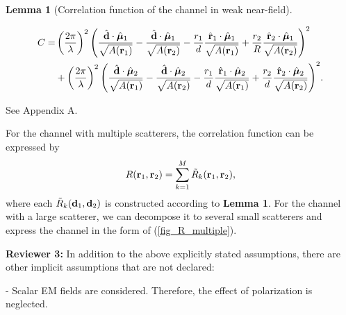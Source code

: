 \documentclass[a4paper,12pt]{article}
\newtheorem{lemma}{\bf Lemma}
\newenvironment{IEEEproof}{{\it Proof. }}{}
\begin{document}
\begin{framed}
\begin{lemma}[{\color{red}Correlation function of the channel in weak near-field}]
\begin{equation}
\begin{aligned}
	   \end{aligned}
   \end{equation}
   \else
   \begin{equation}
	   \begin{aligned}
		C =& \left( \frac{2\pi}{\lambda}  \right)^2 \Bigg( \frac{\hat{\bf d}\cdot \hat{\boldsymbol{\mu}}_1}{\sqrt{A({\bf r}_1)}} - \frac{\hat{\bf d}\cdot \hat{\boldsymbol{\mu}}_1}{\sqrt{A({\bf r}_2)}} - \frac{r_1}{d} \frac{\hat{\bf r}_1 \cdot \hat{\boldsymbol{\mu}}_1}{\sqrt{A({\bf r}_1)}} + \frac{r_2}{R} \frac{\hat{\bf r}_2 \cdot \hat{\boldsymbol{\mu}}_1}{\sqrt{A({\bf r}_2)}}\Bigg)^2 \\&+  \left( \frac{2\pi}{\lambda}  \right)^2 \Bigg( \frac{\hat{\bf d}\cdot \hat{\boldsymbol{\mu}}_2}{\sqrt{A({\bf r}_1)}} - \frac{\hat{\bf d}\cdot \hat{\boldsymbol{\mu}}_2}{\sqrt{A({\bf r}_2)}} - \frac{r_1}{d} \frac{\hat{\bf r}_1 \cdot \hat{\boldsymbol{\mu}}_2}{\sqrt{A({\bf r}_1)}} + \frac{r_2}{d} \frac{\hat{\bf r}_2 \cdot \hat{\boldsymbol{\mu}}_2}{\sqrt{A({\bf r}_2)}}\Bigg)^2.
	   \end{aligned}
   \end{equation}
   \fi
	\end{lemma}
	\begin{IEEEproof}
	See Appendix A.
	\end{IEEEproof}

\quad For the channel with multiple scatterers, the correlation function can be expressed by
\begin{equation}
	\begin{aligned}
		R({\bf r}_1,{\bf r}_2) = \sum_{k=1}^{M}\tilde{R}_k({\bf r}_1,{\bf r}_2),
	\end{aligned}
	\label{fig_R_multiple}
\end{equation}		
where each $\tilde{R}_k({\bf d}_1,{\bf d}_2)$ is constructed according to {\bf Lemma 1}. {\color{red}For the channel with a large scatterer, we can decompose it to several small scatterers and express the channel in the form of (\ref{fig_R_multiple}).}
    
\end{framed}

\textbf{Reviewer 3:}
In addition to the above explicitly stated assumptions, there are other implicit assumptions that are not declared:

-   Scalar EM fields are considered. Therefore, the effect of polarization is neglected.

{}
\end{document}
